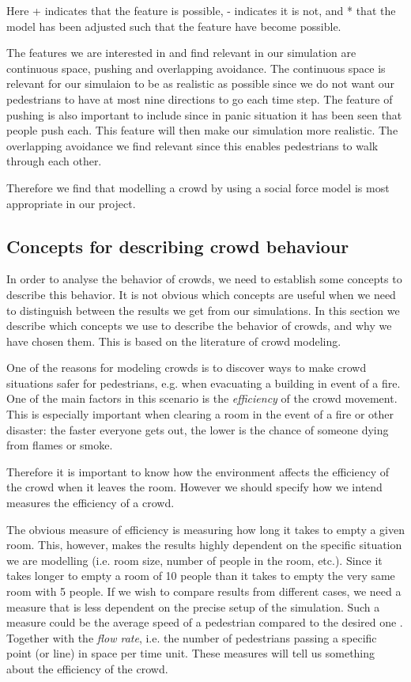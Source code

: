 Here + indicates that the feature is possible, - indicates it is not, and * that 
the model has been adjusted such that the feature have become possible. \cite{Comparison}

The features we are interested in and find relevant in our simulation are 
continuous space, pushing and overlapping avoidance. The continuous space is 
relevant for our simulaion to be as realistic as possible since we do not want 
our pedestrians to have at most nine directions to go each time step.
The feature of pushing is also important to include since in panic situation it 
has been seen that people push each. This feature will then make our simulation 
more realistic. The overlapping avoidance we find relevant since this enables 
pedestrians to walk through each other.

Therefore we find that modelling a crowd by using a social force model is most 
appropriate in our project. 


\subsection{Concepts for describing crowd behaviour}
In order to analyse the behavior of crowds, we need to establish some 
concepts to describe this behavior. It is not obvious which concepts  are 
useful when we need to distinguish between the results we get from our 
simulations. In this section we describe which concepts we use to describe the 
behavior of crowds, and why we have chosen them. This is based on the 
literature of crowd modeling.

One of the reasons for modeling crowds is to discover ways to make crowd 
situations safer for pedestrians, e.g. when evacuating a building in event of 
a fire. One of the main factors in this scenario is the \emph{efficiency} of 
the crowd movement. This is especially important when clearing a room in the 
event of a fire or other disaster: the faster everyone gets out, the lower is 
the chance of someone dying from flames or smoke.

Therefore it is important to know how the environment affects the efficiency 
of the crowd when it leaves the room. However we should specify how we intend 
measures the efficiency of a crowd.

The obvious measure of efficiency is measuring how long it takes to empty a 
given room. This, however, makes the results highly dependent on the specific 
situation we are modelling (i.e. room size, number of people in the room, 
etc.). Since it takes longer to empty a room of 10 people than it takes to
empty the very same room with 5 people. If we wish to compare results from 
different cases, we need a measure that is less dependent on the precise setup
of the simulation. Such a measure could be the average speed of a pedestrian 
compared to the desired one \cite{self-org}. Together with the \emph{flow rate}, 
i.e. the number of pedestrians passing a specific point (or line) in space per 
time unit. These measures will tell us something about the efficiency of the crowd.

